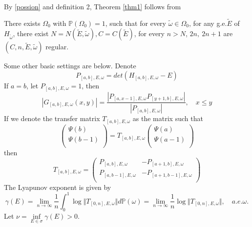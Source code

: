 By \eqref{possion} and definition 2, Theorem  \ref{thm1} follows from
\begin{thm}\label{thm2}
  There exists $ \Omega_0$ with $\mathbb{P}(\Omega_0)=1$, such that for every $ \tilde{\omega}\in\Omega_0$, for any g.e.$\tilde{E}$ of $H_{\tilde{\omega}}$, there exist $ N=N(\tilde{E},\tilde{\omega}),C=C(\tilde{E})$, for every $ n>N$, $2n,~2n+1$ are $(C,n,\tilde{E},\tilde{\omega})$ regular.
\end{thm}

Some other basic settings are below. Denote
\[
  P_{[a,b],E,\omega}=det(H_{[a,b],E,\omega}-E)
\]
If $a=b$, let $  P_{[a,b],E,\omega}=1$, then
\begin{equation}\label{A}
  \left\vert G_{[a,b],E,\omega}(x,y)\right\vert=\frac{\left\vert P_{[a,x-1],E,\omega}P_{[y+1,b],E,\omega}\right\vert}{\left\vert P_{[a,b],E,\omega}\right\vert},\quad x\leq y
\end{equation}
If we denote the transfer matrix $T_{[a,b],E,\omega}$ as the matrix such that
\[
\left(
\begin{array}{c}
  \Psi(b)\\
  \Psi(b-1)\\
\end{array}
\right)
=T_{[a,b],E,\omega} \left(
\begin{array}{c}
  \Psi(a)\\
  \Psi(a-1)\\
\end{array}
\right)
\]
then
\[
T_{[a,b],E,\omega}=\left(
  \begin{array}{cc}
    P_{[a,b],E,\omega} & -P_{[a+1,b],E,\omega}\\
    P_{[a,b-1],E,\omega} & -P_{[a+1,b-1],E,\omega}\\
  \end{array}
  \right)
\]
The Lyapunov exponent is given by
  \[
    \gamma(E)=\lim_{n\to\infty}\frac{1}{n}\int_0^1 \log\Vert T_{[0,n],E,\omega}\Vert d\mathbb{P}(\omega)=\lim_{n\rightarrow\infty}\frac{1}{n} \log\Vert T_{[0,n],E,\omega}\Vert, \quad a.e.\omega.
  \]
Let $\nu=\inf\limits_{E\in \sigma}\gamma(E)>0$.

